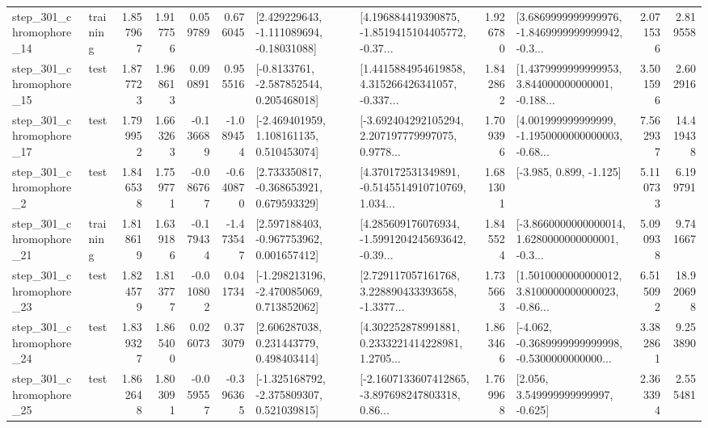 \begin{tabular}{llrrrrllrlrr}
  step\_301\_chromophore\_14 &  training &      1.857967 &    1.917756 &      0.059789 &  0.676045 &    [2.429229643, -1.111089694, -0.18031088] &  [4.196884419390875, -1.8519415104405772, -0.37... &       1.926780 &  [3.6869999999999976, -1.8469999999999942, -0.3... &            2.071536 &          2.819558 \\
  step\_301\_chromophore\_15 &      test &      1.877723 &    1.968613 &      0.090891 &  0.955516 &     [-0.8133761, -2.587852544, 0.205468018] &  [1.4415884954619858, 4.315266426341057, -0.337... &       1.842862 &  [1.4379999999999953, 3.844000000000001, -0.188... &            3.501596 &          2.602916 \\
  step\_301\_chromophore\_17 &      test &      1.799952 &    1.663263 &     -0.136689 & -1.089454 &    [-2.469401959, 1.108161135, 0.510453074] &  [-3.692404292105294, 2.207197779997075, 0.9778... &       1.709396 &  [4.001999999999999, -1.1950000000000003, -0.68... &            7.562937 &         14.419438 \\
   step\_301\_chromophore\_2 &      test &      1.846538 &    1.759771 &     -0.086767 & -0.640870 &    [2.733350817, -0.368653921, 0.679593329] &  [4.370172531349891, -0.5145514910710769, 1.034... &       1.681301 &                            [-3.985, 0.899, -1.125] &            5.110733 &          6.199791 \\
  step\_301\_chromophore\_21 &  training &      1.818619 &    1.639186 &     -0.179434 & -1.473547 &    [2.597188403, -0.967753962, 0.001657412] &  [4.285609176076934, -1.5991204245693642, -0.39... &       1.845524 &  [-3.8660000000000014, 1.6280000000000001, -0.3... &            5.090938 &          9.741667 \\
  step\_301\_chromophore\_23 &      test &      1.824579 &    1.813777 &     -0.010802 &  0.041734 &   [-1.298213196, -2.470085069, 0.713852062] &  [2.729117057161768, 3.228890433393658, -1.3377... &       1.735663 &  [1.5010000000000012, 3.8100000000000023, -0.86... &            6.515092 &         18.920698 \\
  step\_301\_chromophore\_24 &      test &      1.839327 &    1.865400 &      0.026073 &  0.373079 &     [2.606287038, 0.231443779, 0.498403414] &  [4.302252878991881, 0.2333221414228981, 1.2705... &       1.863466 &  [-4.062, -0.3689999999999998, -0.5300000000000... &            3.382861 &          9.253890 \\
  step\_301\_chromophore\_25 &      test &      1.862648 &    1.803091 &     -0.059557 & -0.396365 &   [-1.325168792, -2.375809307, 0.521039815] &  [-2.1607133607412865, -3.897698247803318, 0.86... &       1.769968 &                 [2.056, 3.549999999999997, -0.625] &            2.363394 &          2.555481 \\

\end{tabular}
